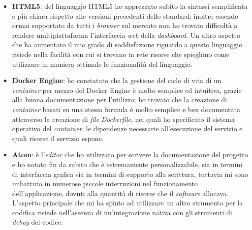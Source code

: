 \begin{itemize}
  \item \textbf{HTML5}: del linguaggio HTML5 ho apprezzato subito la sintassi semplificata e più chiara rispetto alle versioni precedenti dello standard; inoltre essendo ormai supportato da tutti i \emph{browser} sul mercato non ho trovato difficoltà a rendere multipiattaforma l'interfaccia \emph{web} della \emph{dashboard}. Un altro aspetto che ha aumentato il mio grado di soddisfazione riguardo a questo linguaggio risiede nella facilità con cui si trovano in rete risorse che spieghino come utilizzare in maniera ottimale le funzionalità del linguaggio.
  \item \textbf{Docker Engine}: ho constatato che la gestione del ciclo di vita di un \emph{container} per mezzo del Docker Engine è molto semplice ed intuitiva, grazie alla buona documentazione per l'utilizzo; ho trovato che la creazione di \emph{container} basati su una stessa formula è molto semplice e ben documentata attraverso la creazione di \emph{file} \emph{Dockerfile}, nei quali ho specificato il sistema operativo del \emph{container}, le dipendenze necessarie all'esecuzione del servizio e quali risorse il servizio espone.
  \item \textbf{Atom}: è l'\emph{editor} che ho utilizzato per scrivere la documentazione del progetto e ho notato fin da subito che è estremamente personalizzabile, sia in termini di interfaccia grafica sia in termini di supporto alla scrittura, tuttavia mi sono imbattuto in numerose piccole interruzioni nel funzionamento dell'applicazione, dovuti alla quantità di risorse che il \emph{software} allocava. L'aspetto principale che mi ha spinto ad utilizzare un altro strumento per la codifica risiede nell'assenza di un'integrazione nativa con gli strumenti di \emph{debug} del codice.
\end{itemize}

